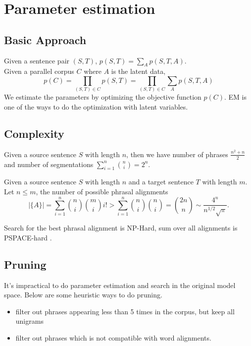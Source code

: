 \documentclass[11pt, letterpaper]{article}   	%
\begin{document}
\section{Parameter estimation}
\subsection{Basic Approach}
Given a sentence pair $(S,T)$, $p(S,T)=\sum_{A}p(S,T,A)$.\\
Given a parallel corpus $C$ where $A$ is the latent data, 
\begin{equation}p(C)=\prod_{(S,T) \in C} p(S,T)=\prod_{(S,T) \in C} \sum_{A} p(S,T,A) \end{equation}
We estimate the parameters by optimizing the objective function $p(C)$. EM is one of the ways to do the optimization with latent variables.

\subsection{Complexity}
Given a source sentence $S$ with length $n$, then we have number of phrases $\frac{n^2+n}{2}$ and number of segmentations $\sum\limits_{i=1}^n {n \choose i} = 2^n$. 

Given a source sentence $S$ with length $n$ and a target sentence $T$ with length $m$.  Let $n \leqslant m $, the number of possible phrasal alignments 
\begin{equation}
|\{A\}|= \sum \limits_{i=1}^n {n \choose i}{m \choose i}i!  > \sum \limits_{i=1}^n {n \choose i}{n \choose i} = {2n \choose n} \sim \frac{4^n}{n^{1/2} \sqrt{\pi}}.
\end{equation}

Search for the best phrasal alignment is NP-Hard, sum over all alignments is PSPACE-hard \cite{denero-acl-08}.


\subsection{Pruning}
It's impractical to do parameter estimation and search in the original model space. Below are some heuristic ways to do pruning.
\begin{itemize}
\item filter out phrases appearing less than 5 times in the corpus, but keep all unigrams \cite{marcu-wong-02}
\item filter out phrases which is not compatible with word alignments. \cite{denero-06-wmt}
\end{itemize}
\end{document}
